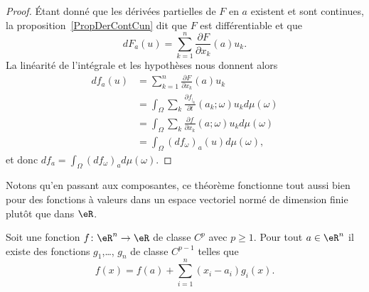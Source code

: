 \begin{proof}
    Étant donné que les dérivées partielles de \( F\) en \( a\) existent et sont continues, la proposition~\ref{PropDerContCun} dit que \( F\) est différentiable et que
    \begin{equation}
        dF_a(u)=\sum_{k=1}^n\frac{ \partial F }{ \partial x_k }(a)u_k.
    \end{equation}
    La linéarité de l'intégrale et les hypothèses nous donnent alors
    \begin{subequations}
        \begin{align}
            df_a(u)&=\sum_{k=1}^n\frac{ \partial F }{ \partial x_k }(a)u_k\\
            &=\int_{\Omega}\sum_k\frac{ \partial f_{|_k} }{ \partial t }(a_k;\omega)u_kd\mu(\omega)\\
            &=\int_{\Omega}\sum_k\frac{ \partial f }{ \partial x_k }(a;\omega)u_kd\mu(\omega)\\
            &=\int_{\Omega}(df_{\omega})_a(u)d\mu(\omega),
        \end{align}
    \end{subequations}
    et donc \( df_a=\int_{\Omega}(df_{\omega})_ad\mu(\omega)\).
\end{proof}
Notons qu'en passant aux composantes, ce théorème fonctionne tout aussi bien pour des fonctions à valeurs dans un espace vectoriel normé de dimension finie plutôt que dans \( \eR\).

\begin{lemma}   \label{LemWNBooGPlIwT}
    Soit une fonction \( f\colon \eR^n\to \eR\) de classe \( C^p\) avec \( p\geq 1\). Pour tout \( a\in \eR^n\) il existe des fonctions \( g_1\),\ldots, \( g_n\) de classe \( C^{p-1}\) telles que
    \begin{equation}
        f(x)=f(a)+\sum_{i=1}^n(x_i-a_i)g_i(x).
    \end{equation}
\end{lemma}

